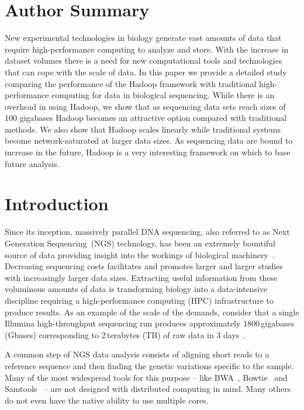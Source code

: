 \documentclass[10pt]{article}
\begin{document}
\section*{Author Summary}
New experimental technologies in biology generate vast amounts of data that require
high-performance computing to analyze and store. With the increase in dataset volumes there is a need for new computational tools and technologies that can cope with the scale of data. In this paper we provide a detailed study comparing the performance of the Hadoop framework with traditional high-performance computing for data in biological sequencing. While there is an overhead in using Hadoop, we show that as sequencing data sets reach sizes of 100 gigabases Hadoop becomes an attractive option compared with traditional methods. We also show that Hadoop scales linearly while traditional systems become network-saturated at larger data sizes. As sequencing data are bound to increase in the future, Hadoop is a very interesting framework on which to base future analysis.





\section*{Introduction}
Since its inception, massively parallel DNA sequencing, also referred to as Next Generation Sequencing~(NGS) technology, has been an extremely bountiful source of data providing insight into the workings of biological machinery~\cite{metzker, Marx:2013fk}. Decreasing sequencing costs facilitates and promotes larger and larger studies with increasingly larger data sizes. Extracting useful information from these voluminous amounts of data is transforming biology into a data-intensive discipline requiring a high-performance computing (HPC) infrastructure to produce results.  As an example of the scale of the demands, consider that a single Illumina high-throughput sequencing run produces approximately 1800\,gigabases (Gbases) corresponding to 2\,terabytes (TB) of raw data in 3 days~\cite{illumina}.

A common step of NGS data analysis consists of aligning short reads to a reference sequence and then finding the genetic variations specific to the sample.
Many of the most widespread tools for this purpose -- like BWA~\cite{bwa}, Bowtie~\cite{Langmead:2009uq} and Samtools~\cite{samtools} -- are not designed with distributed computing in mind. Many others do not even have the native ability to use multiple cores.
\end{document}
